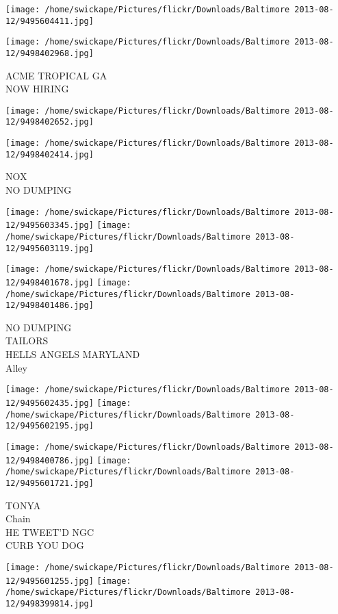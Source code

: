 \documentclass[10pt,letterpaper]{article}
\begin{document}
\texttt{[image: /home/swickape/Pictures/flickr/Downloads/Baltimore 2013-08-12/9495604411.jpg]}

\vspace{0.25in}
\texttt{[image: /home/swickape/Pictures/flickr/Downloads/Baltimore 2013-08-12/9498402968.jpg]}

ACME TROPICAL GA\\
NOW HIRING
\pagebreak

\texttt{[image: /home/swickape/Pictures/flickr/Downloads/Baltimore 2013-08-12/9498402652.jpg]}

\vspace{0.25in}
\texttt{[image: /home/swickape/Pictures/flickr/Downloads/Baltimore 2013-08-12/9498402414.jpg]}

NOX\\
NO DUMPING
\pagebreak

\texttt{[image: /home/swickape/Pictures/flickr/Downloads/Baltimore 2013-08-12/9495603345.jpg]}
\texttt{[image: /home/swickape/Pictures/flickr/Downloads/Baltimore 2013-08-12/9495603119.jpg]}

\texttt{[image: /home/swickape/Pictures/flickr/Downloads/Baltimore 2013-08-12/9498401678.jpg]}
\texttt{[image: /home/swickape/Pictures/flickr/Downloads/Baltimore 2013-08-12/9498401486.jpg]}

NO DUMPING\\
TAILORS\\
HELLS ANGELS MARYLAND\\
Alley
\pagebreak

\texttt{[image: /home/swickape/Pictures/flickr/Downloads/Baltimore 2013-08-12/9495602435.jpg]}
\texttt{[image: /home/swickape/Pictures/flickr/Downloads/Baltimore 2013-08-12/9495602195.jpg]}

\texttt{[image: /home/swickape/Pictures/flickr/Downloads/Baltimore 2013-08-12/9498400786.jpg]}
\texttt{[image: /home/swickape/Pictures/flickr/Downloads/Baltimore 2013-08-12/9495601721.jpg]}

TONYA\\
Chain\\
HE TWEET'D NGC\\
CURB YOU DOG
\pagebreak

\texttt{[image: /home/swickape/Pictures/flickr/Downloads/Baltimore 2013-08-12/9495601255.jpg]}
\texttt{[image: /home/swickape/Pictures/flickr/Downloads/Baltimore 2013-08-12/9498399814.jpg]}
\end{document}
